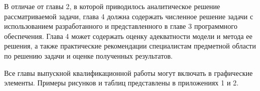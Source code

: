В отличае от главы 2, в которой приводилось аналитическое решение рассматриваемой задачи, глава 4 должна содержать численное решение задачи с использованием разработанного и представленного в главе 3 программного обеспечения. Глава 4 может содержать оценку адекватности модели и метода ее решения, а также практические рекомендации специалистам предметной области по решению задачи и оценке полученных результатов.

Все главы выпускной квалификационной работы могут включать в графические элементы. Примеры рисунков и таблиц представлены в приложениях 1 и 2. 





